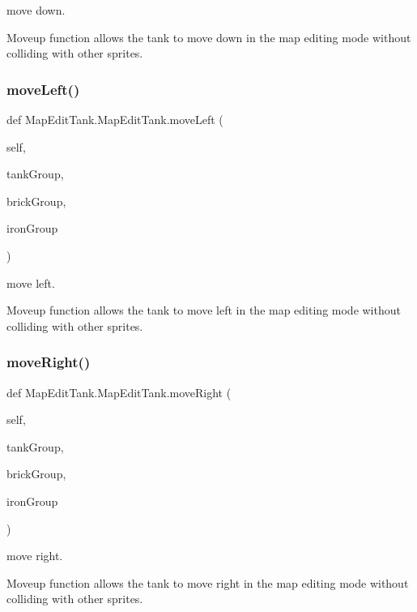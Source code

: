 move down. 

Moveup function allows the tank to move down in the map editing mode without colliding with other sprites. \mbox{\label{class_map_edit_tank_1_1_map_edit_tank_a738b438a43db803d89e1d42aa980c79b}} 
\subsubsection{\texorpdfstring{moveLeft()}{moveLeft()}}
{\footnotesize\ttfamily def Map\+Edit\+Tank.\+Map\+Edit\+Tank.\+move\+Left (\begin{DoxyParamCaption}\item[{}]{self,  }\item[{}]{tank\+Group,  }\item[{}]{brick\+Group,  }\item[{}]{iron\+Group }\end{DoxyParamCaption})}



move left. 

Moveup function allows the tank to move left in the map editing mode without colliding with other sprites. \mbox{\label{class_map_edit_tank_1_1_map_edit_tank_a22cba3ac0ac67ea3a779e6490b6575e5}} 
\subsubsection{\texorpdfstring{moveRight()}{moveRight()}}
{\footnotesize\ttfamily def Map\+Edit\+Tank.\+Map\+Edit\+Tank.\+move\+Right (\begin{DoxyParamCaption}\item[{}]{self,  }\item[{}]{tank\+Group,  }\item[{}]{brick\+Group,  }\item[{}]{iron\+Group }\end{DoxyParamCaption})}



move right. 

Moveup function allows the tank to move right in the map editing mode without colliding with other sprites. \mbox{\label{class_map_edit_tank_1_1_map_edit_tank_af78bf27879a5b2a2c6edc8fe31714b28}} 
